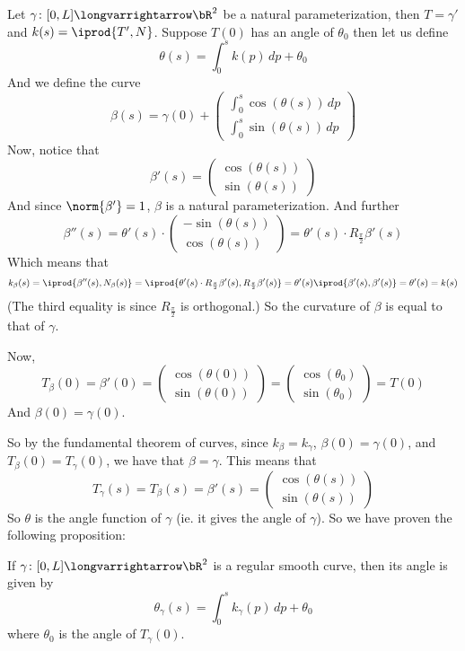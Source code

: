 \documentclass[10pt]{article}
\def\pmat#1{\begin{pmatrix} #1 \end{pmatrix}}
\def\pmat#1{\begin{pmatrix}#1\end{pmatrix}}
\let\longto=\longvarrightarrow
\begin{document}


\bigskip

Let $\gamma\colon[0,L]\longto\bR^2$ be a natural parameterization, then $T=\gamma'$ and $k(s)=\iprod{T',N}$.
Suppose $T(0)$ has an angle of $\theta_0$ then let us define
\[ \theta(s) = \int_0^s k(p)\,dp + \theta_0 \]
And we define the curve
\[ \beta(s) = \gamma(0) + \pmat{\int_0^s\cos(\theta(s))\,dp\\\int_0^s\sin(\theta(s))\,dp} \]
Now, notice that
\[ \beta'(s) = \pmat{\cos(\theta(s))\\\sin(\theta(s))} \]
And since $\norm{\beta'}=1$, $\beta$ is a natural parameterization.
And further
\[ \beta''(s) = \theta'(s)\cdot\pmat{-\sin(\theta(s))\\\cos(\theta(s))} = \theta'(s)\cdot R_{\frac\pi2}\beta'(s) \]
Which means that
\[ k_\beta(s) = \iprod{\beta''(s), N_\beta(s)} = \iprod{\theta'(s)\cdot R_{\frac\pi2}\beta'(s), R_{\frac\pi2}\beta'(s)} = \theta'(s)\iprod{\beta'(s),\beta'(s)}=\theta'(s)=k(s) \]
(The third equality is since $R_{\frac\pi2}$ is orthogonal.)
So the curvature of $\beta$ is equal to that of $\gamma$.

Now,
\[ T_\beta(0) = \beta'(0) = \pmat{\cos(\theta(0))\\\sin(\theta(0))} = \pmat{\cos(\theta_0)\\\sin(\theta_0)} = T(0) \]
And $\beta(0)=\gamma(0)$.

So by the fundamental theorem of curves, since $k_\beta=k_\gamma$, $\beta(0)=\gamma(0)$, and $T_\beta(0)=T_\gamma(0)$, we have that $\beta=\gamma$.
This means that
\[ T_\gamma(s) = T_\beta(s) = \beta'(s) = \pmat{\cos(\theta(s))\\\sin(\theta(s))} \]
So $\theta$ is the angle function of $\gamma$ (ie. it gives the angle of $\gamma$).
So we have proven the following proposition:

\begin{prop*}

    If $\gamma\colon[0,L]\longto\bR^2$ is a regular smooth curve, then its angle is given by
    \[ \theta_\gamma(s) = \int_0^s k_\gamma(p)\,dp + \theta_0 \]
    where $\theta_0$ is the angle of $T_\gamma(0)$.

\end{prop*}
\end{document}
